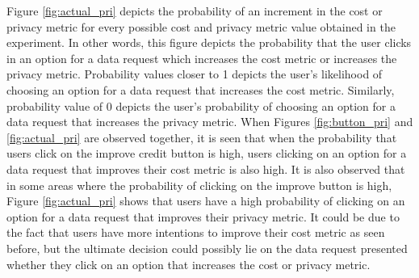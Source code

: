 Figure \ref{fig:actual_pri} depicts the probability of an increment in the cost or privacy metric for every possible cost and privacy metric value obtained in the experiment. In other words, this figure depicts the probability that the user clicks in an option for a data request which increases the cost metric or increases the privacy metric. Probability values closer to 1 depicts the user's likelihood of choosing an option for a data request that increases the cost metric. Similarly, probability value of 0 depicts the user's probability of choosing an option for a data request that increases the privacy metric. When Figures \ref{fig:button_pri} and \ref{fig:actual_pri} are observed together, it is seen that when the probability that users click on the improve credit button is high, users clicking on an option for a data request that improves their cost metric is also high. It is also observed that in some areas where the probability of clicking on the improve button is high, Figure \ref{fig:actual_pri} shows that users have a high probability of clicking on an option for a data request that improves their privacy metric. It could be due to the fact that users have more intentions to improve their cost metric as seen before, but the ultimate decision could possibly lie on the data request presented whether they click on an option that increases the cost or privacy metric.

%
%

